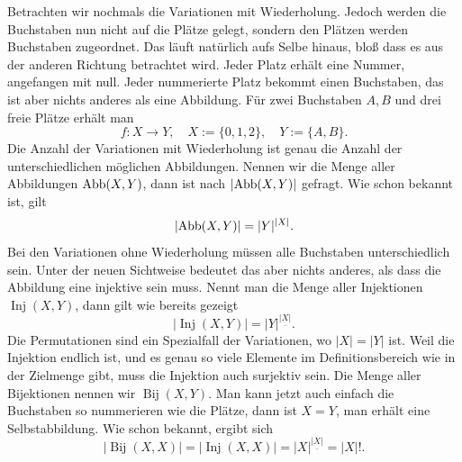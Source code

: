 Betrachten wir nochmals die Variationen mit Wiederholung. Jedoch werden
die Buchstaben nun nicht auf die Plätze gelegt, sondern den Plätzen
werden Buchstaben zugeordnet. Das läuft natürlich aufs Selbe hinaus,
bloß dass es aus der anderen Richtung betrachtet wird. Jeder Platz
erhält eine Nummer, angefangen mit null. Jeder nummerierte Platz
bekommt einen Buchstaben, das ist aber nichts anderes als eine
Abbildung. Für zwei Buchstaben $A,B$ und drei freie Plätze
erhält man
\[f\colon X\to Y,\quad X:=\{0,1,2\},\quad Y:=\{A,B\}.\]
Die Anzahl der Variationen mit Wiederholung ist genau die Anzahl
der unterschiedlichen möglichen Abbildungen. Nennen wir die Menge aller
Abbildungen $\operatorname{Abb}(X,Y)$, dann ist nach $|{\operatorname{Abb}(X,Y)}|$ gefragt.
Wie schon bekannt ist, gilt%
\[|{\operatorname{Abb}(X,Y)}| = |Y|^{|X|}.\]
Bei den Variationen ohne Wiederholung müssen alle Buchstaben
unterschiedlich sein. Unter der neuen Sichtweise bedeutet das aber
nichts anderes, als dass die Abbildung eine injektive sein muss.
Nennt man die Menge aller Injektionen $\operatorname{Inj}(X,Y)$,
dann gilt wie bereits gezeigt%
\[|{\operatorname{Inj}(X,Y)}| = |Y|^{\underline{|X|}}.\]
Die Permutationen sind ein Spezialfall der Variationen,
wo $|X|=|Y|$ ist. Weil die Injektion endlich ist, und es genau
so viele Elemente im Definitionsbereich wie in der Zielmenge gibt,
muss die Injektion auch surjektiv sein. Die Menge aller Bijektionen
nennen wir $\operatorname{Bij}(X,Y)$. Man kann jetzt auch einfach
die Buchstaben so nummerieren wie die Plätze, dann ist $X=Y$,
man erhält eine Selbstabbildung. Wie schon bekannt, ergibt sich%
\[|{\operatorname{Bij}(X,X)}| = |{\operatorname{Inj}(X,X)}|
= |X|^{\underline{|X|}} = |X|!.\]


